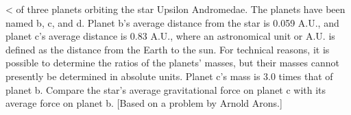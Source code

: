 <%
of three planets orbiting the star Upsilon Andromedae. The
planets have been named b, c, and d. Planet b's
average distance from the star is 0.059 A.U., and planet c's
average distance is 0.83 A.U., where an astronomical unit or
A.U. is defined as the distance from the Earth to the sun.
For technical reasons, it is possible to determine the
ratios of the planets' masses, but their masses cannot
presently be determined in absolute units. Planet c's mass
is 3.0 times that of planet b. Compare the star's average
gravitational force on planet c with its average force on
planet b. [Based on a problem by Arnold Arons.]
